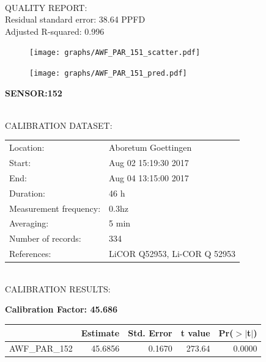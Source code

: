 \documentclass[oneside]{report}
\begin{document}
\hrulefill\\
QUALITY REPORT:\\
Residual standard error: 38.64 PPFD\\
Adjusted R-squared: 0.996



\begin{figure}[H]
  \centering
  \texttt{[image: graphs/AWF\_PAR\_151\_scatter.pdf]}
\end{figure}




\begin{figure}[H]
  \centering
  \texttt{[image: graphs/AWF\_PAR\_151\_pred.pdf]}
\end{figure}

\pagebreak


\begin{center}
\large{\textbf{SENSOR:152}}\\
\end{center}

\hrulefill\\
CALIBRATION DATASET:\\
\begin{table}[h!]
  \centering
  \label{tab:table1}
  \begin{tabular}{ll}
    Location: & Aboretum Goettingen\\ 
    
    
    Start:  & Aug 02 15:19:30 2017 \\
    End:   & Aug 04 13:15:00 2017\\ 
    Duration: & 46 h\\
    Measurement frequency: & 0.3hz\\
    Averaging:  &5 min\\
    Number of records: & 334 \\
    References: & LiCOR Q52953, Li-COR Q 52953 \\
  \end{tabular}
\end{table}

\hrulefill\\
CALIBRATION RESULTS:\\


\begin{center}
\textbf{\large{Calibration Factor: 45.686}}\\
\end{center}
\begin{table}[ht]
\centering
\begin{tabular}{rrrrr}
  \hline
 & Estimate & Std. Error & t value & Pr($>$$|$t$|$) \\ 
  \hline
AWF\_PAR\_152 & 45.6856 & 0.1670 & 273.64 & 0.0000 \\ 
   \hline
\end{tabular}
\end{table}
\end{document}
